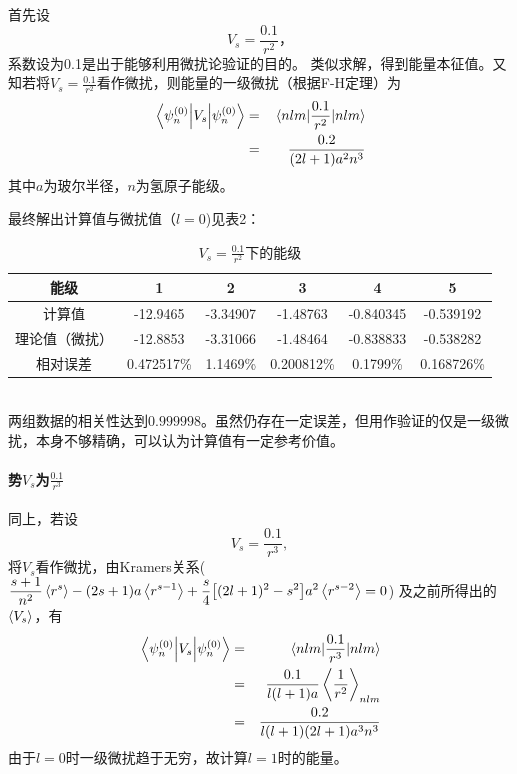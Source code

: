 \documentclass[hyperref,cs4size,titlepage,twoside]{ctexart}
\begin{document}
首先设
\begin{equation}
V_s=\frac{0.1}{r^2}，
\end{equation}
系数设为0.1是出于能够利用微扰论验证的目的。
类似求解，得到能量本征值。又知若将$\displaystyle V_s=\frac{0.1}{r^2}$看作微扰，则能量的一级微扰（根据F-H定理）为
\begin{eqnarray*}
\ev{V_s}{\psi_n^{(0)}} &=& \mel{nlm}{\frac{0.1}{r^2}}{nlm} \\
   &=& \frac{0.2}{(2l+1)a^2n^3}
\end{eqnarray*}\label{}
其中$a$为玻尔半径，$n$为氢原子能级。

最终解出计算值与微扰值（$l=0$)见表2：
\begin{table}[!htbp]
  \centering
  \begin{tabular}{|c|c|c|c|c|c|}
    \hline
    能级 & 1 & 2 & 3 & 4 & 5 \\
    \hline
    计算值 & -12.9465 & -3.34907 & -1.48763 & -0.840345 & -0.539192 \\
    \hline
    理论值（微扰） & -12.8853 & -3.31066 & -1.48464 & -0.838833 & -0.538282 \\
    \hline
    相对误差 & 0.472517\% & 1.1469\% & 0.200812\% & 0.1799\% & 0.168726\% \\
    \hline
  \end{tabular}
  \caption{$\displaystyle V_s=\frac{0.1}{r^2}$下的能级}
\end{table}\\
两组数据的相关性达到$0.999998$。虽然仍存在一定误差，但用作验证的仅是一级微扰，本身不够精确，可以认为计算值有一定参考价值。
\paragraph{势$V_s$为$\displaystyle\frac{0.1}{r^3}$}


同上，若设
\begin{equation}\label{Vs2}
  V_s=\frac{0.1}{r^3},
\end{equation}
将$V_s$看作微扰，由Kramers关系($\displaystyle\frac{s+1}{n^2}\ev{r^s}-(2s+1)a\ev{r^{s-1}}+\frac{s}{4}\bqty{(2l+1)^2-s^2}a^2\ev{r^{s-2}}=0$) 及之前所得出的$\ev{V_s}$，有
\begin{eqnarray*}
 \ev{V_s}{\psi_n^{(0)}} &=& \mel{nlm}{\frac{0.1}{r^3}}{nlm} \\
   &=& \frac{0.1}{l(l+1)a}\ev{\frac{1}{r^2}}_{nlm}  \\
   &=& \frac{0.2}{l(l+1)(2l+1)a^3n^3}
\end{eqnarray*}
由于$l=0$时一级微扰趋于无穷，故计算$l=1$时的能量。
\end{document}
